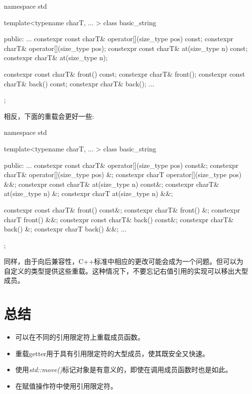 \begin{codebox}[cpp]
namespace std {
  template<typename charT, ... >
  class basic_string {
  public:
    ...
    constexpr const charT& operator[](size_type pos) const;
    constexpr charT& operator[](size_type pos);
    constexpr const charT& at(size_type n) const;
    constexpr charT& at(size_type n);

    constexpr const charT& front() const;
    constexpr charT& front();
    constexpr const charT& back() const;
    constexpr charT& back();
    ...
  };
}
\end{codebox}

相反，下面的重载会更好一些:\par

\begin{codebox}[cpp]
namespace std {
  template<typename charT, ... >
  class basic_string {
  public:
    ...
    constexpr const charT& operator[](size_type pos) const&;
    constexpr charT& operator[](size_type pos) &;
    constexpr charT operator[](size_type pos) &&;
    constexpr const charT& at(size_type n) const&;
    constexpr charT& at(size_type n) &;
    constexpr charT at(size_type n) &&;

    constexpr const charT& front() const&;
    constexpr charT& front() &;
    constexpr charT front() &&;
    constexpr const charT& back() const&;
    constexpr charT& back() &;
    constexpr charT back() &&;
    ...
  };
}
\end{codebox}

同样，由于向后兼容性，C++标准中相应的更改可能会成为一个问题。但可以为自定义的类型提供这些重载。这种情况下，不要忘记右值引用的实现可以移出大型成员。\par


\section{总结}

\begin{itemize}
  \item 可以在不同的引用限定符上重载成员函数。
  \item 重载getter用于具有引用限定符的大型成员，使其既安全又快速。
  \item 使用\textit{std::move()}标记对象是有意义的，即使在调用成员函数时也是如此。
  \item 在赋值操作符中使用引用限定符。
\end{itemize}
